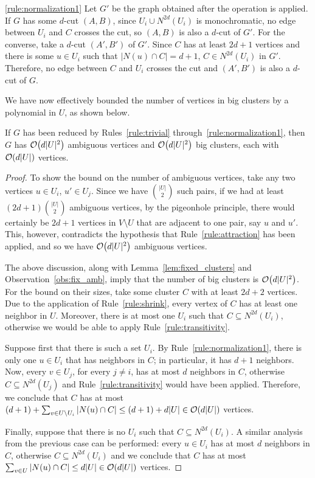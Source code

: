 \begin{sproof}{\ref{rule:normalization1}}
    Let $G'$ be the graph obtained after the operation is applied.
    If $G$ has some $d$-cut $(A,B)$, since $U_i \cup N^{2d}(U_i)$ is monochromatic, no edge between $U_i$ and $C$ crosses the cut, so $(A,B)$ is also a $d$-cut of $G'$.
    For the converse, take a $d$-cut $(A', B')$ of $G'$.
    Since $C$ has at least $2d+1$ vertices and there is some $u \in U_i$ such that $|N(u) \cap C| = d+1$, $C \in N^{2d}(U_i)$ in $G'$.
    Therefore, no edge between $C$ and $U_i$ crosses the cut and $(A', B')$ is also a $d$-cut of $G$.
\end{sproof}

We have now effectively bounded the number of vertices in big clusters by a polynomial in $U$, as shown below.

\begin{lemma}
    \label{lem:bound1}
    If $G$ has been reduced by Rules~\ref{rule:trivial} through~\ref{rule:normalization1}, then $G$ has $\mathcal{O}\!\left(d|U|^2\right)$ ambiguous vertices and $\mathcal{O}\!\left(d|U|^2\right)$ big clusters, each with $\mathcal{O}\!\left(d|U|\right)$ vertices.
\end{lemma}

\begin{proof}
    To show the bound on the number of ambiguous vertices, take any two vertices $u \in U_i$, $u' \in U_j$.
    Since we have $\binom{|U|}{2}$ such pairs, if we had at least $(2d + 1)\binom{|U|}{2}$ ambiguous vertices, by the pigeonhole principle, there would certainly be $2d+1$ vertices in $V \setminus U$ that are adjacent to one pair, say $u$ and $u'$.
    This, however, contradicts the hypothesis that Rule~\ref{rule:attraction} has been applied, and so we have $\mathcal{O}\!\left(d|U|^2\right)$ ambiguous vertices.

    The above discussion, along with Lemma~\ref{lem:fixed_clusters} and Observation~\ref{obs:fix_amb}, imply that the number of big clusters is $\mathcal{O}\!\left(d|U|^2\right)$.
    For the bound on their sizes, take some cluster $C$ with at least $2d + 2$ vertices.
    Due to the application of Rule~\ref{rule:shrink}, every vertex of $C$ has at least one neighbor in $U$.
    Moreover, there is at most one $U_i$ such that $C \subseteq N^{2d}(U_i)$, otherwise we would be able to apply Rule~\ref{rule:transitivity}.

    Suppose first that there is such a set $U_i$.
    By Rule~\ref{rule:normalization1}, there is only one $u \in U_i$ that has neighbors in $C$; in particular, it has $d+1$ neighbors.
    Now, every $v \in U_j$, for every $j\neq i$, has at most $d$ neighbors in $C$, otherwise $C \subseteq N^{2d}(U_j)$ and Rule~\ref{rule:transitivity} would have been applied.
    Therefore, we conclude that $C$ has at most $(d+1) +  \sum_{v \in U \setminus U_i} |N(u) \cap C| \leq (d+1) + d|U| \in \mathcal{O}\!\left(d|U|\right)$ vertices.

    Finally, suppose that there is no $U_i$ such that $C \subseteq N^{2d}(U_i)$.
    A similar analysis from the previous case can be performed: every $u \in U_i$ has at most $d$ neighbors in $C$, otherwise $C \subseteq N^{2d}(U_i)$ and we conclude that $C$ has at most $\sum_{v \in U} |N(u) \cap C| \leq d|U| \in \mathcal{O}\!\left(d|U|\right)$ vertices.
\end{proof}


